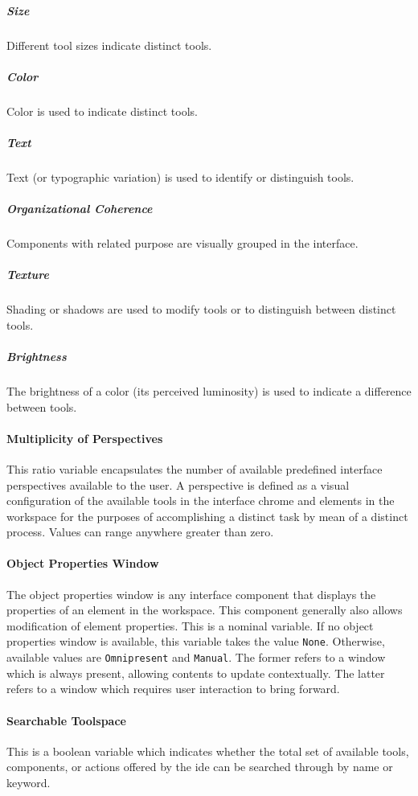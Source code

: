 \subparagraph{Size} Different tool sizes indicate distinct tools.
\cite{moody2009}

\subparagraph{Color} Color is used to indicate distinct tools.
\cite{moody2009}

\subparagraph{Text} Text (or typographic variation) is used to identify or
distinguish tools.~\cite{moody2009}

\subparagraph{Organizational Coherence} Components with related purpose are
visually grouped in the interface.~\cite{constantine1996}

\subparagraph{Texture} Shading or shadows are used to modify tools or to
distinguish between distinct tools.~\cite{moody2009}

\subparagraph{Brightness} The brightness of a color (\ie its perceived
luminosity) is used to indicate a difference between tools.
\cite{moody2009}


\paragraph{Multiplicity of Perspectives} This ratio variable encapsulates
the number of available predefined interface perspectives available to the
user. A perspective is defined as a visual configuration of the available
tools in the interface chrome and elements in the workspace for the
purposes of accomplishing a distinct task by mean of a distinct process.
Values can range anywhere greater than zero.


\paragraph{Object Properties Window} The object properties window is any
interface component that displays the properties of an element in the
workspace. This component generally also allows modification of element
properties. This is a nominal variable. If no object properties window is
available, this variable takes the value \texttt{None}. Otherwise,
available values are \texttt{Omnipresent} and \texttt{Manual}. The former
refers to a window which is always present, allowing contents to update
contextually. The latter refers to a window which requires user interaction
to bring forward.


\paragraph{Searchable Toolspace} This is a boolean variable which indicates
whether the total set of available tools, components, or actions offered by
the \ac{ide} can be searched through by name or keyword.


